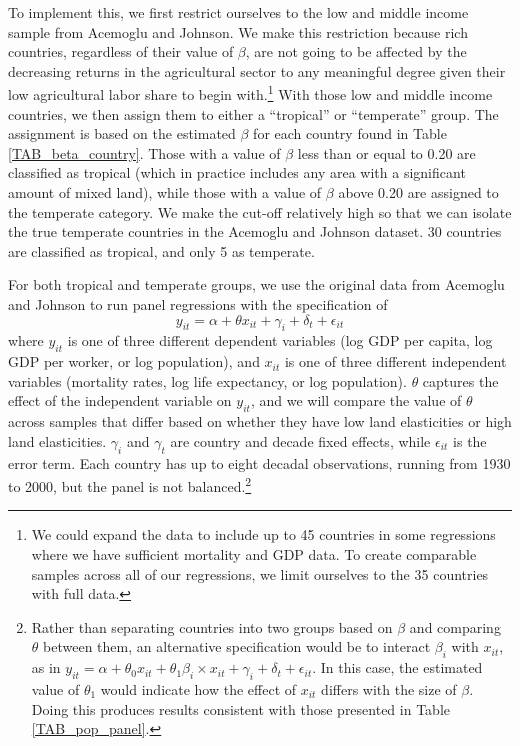 \documentclass[11pt]{article}
\begin{document}
To implement this, we first restrict ourselves to the low and middle income sample from Acemoglu and Johnson. We make this restriction because rich countries, regardless of their value of $\beta$, are not going to be affected by the decreasing returns in the agricultural sector to any meaningful degree given their low agricultural labor share to begin with.\footnote{We could expand the data to include up to 45 countries in some regressions where we have sufficient mortality and GDP data. To create comparable samples across all of our regressions, we limit ourselves to the 35 countries with full data.} With those low and middle income countries, we then assign them to either a ``tropical'' or ``temperate'' group. The assignment is based on the estimated $\beta$ for each country found in Table \ref{TAB_beta_country}. Those with a value of $\beta$ less than or equal to 0.20 are classified as tropical (which in practice includes any area with a significant amount of mixed land), while those with a value of $\beta$ above 0.20 are assigned to the temperate category. We make the cut-off relatively high so that we can isolate the true temperate countries in the Acemoglu and Johnson dataset. 30 countries are classified as tropical, and only 5 as temperate. 

For both tropical and temperate groups, we use the original data from Acemoglu and Johnson to run panel regressions with the specification of
\begin{equation}
    y_{it} = \alpha + \theta x_{it} + \gamma_i + \delta_t + \epsilon_{it}
\end{equation}
where $y_{it}$ is one of three different dependent variables (log GDP per capita, log GDP per worker, or log population), and $x_{it}$ is one of three different independent variables (mortality rates, log life expectancy, or log population). $\theta$ captures the effect of the independent variable on $y_{it}$, and we will compare the value of $\theta$ across samples that differ based on whether they have low land elasticities or high land elasticities. $\gamma_i$ and $\gamma_t$ are country and decade fixed effects, while $\epsilon_{it}$ is the error term. Each country has up to eight decadal observations, running from 1930 to 2000, but the panel is not balanced.\footnote{Rather than separating countries into two groups based on $\beta$ and comparing $\theta$ between them, an alternative specification would be to interact $\beta_i$ with $x_{it}$, as in $y_{it} = \alpha + \theta_0 x_{it} + \theta_1 \beta_i \times x_{it} + \gamma_i + \delta_t + \epsilon_{it}$. In this case, the estimated value of $\theta_1$ would indicate how the effect of $x_{it}$ differs with the size of $\beta$. Doing this produces results consistent with those presented in Table \ref{TAB_pop_panel}.}
\end{document}
